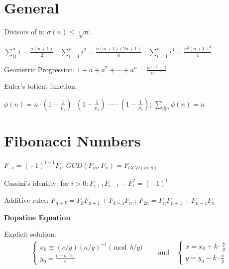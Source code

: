 \documentclass{article}
\begin{document}
\section{General} 
Divisors of n: $\sigma (n) \le \sqrt[3]{n}$. 

$\sum_{i1}^{n}{i}=\frac{n(n+1)}{2}$ ;
$\sum_{i=1}^{n}{i^2} = \frac{n(n+1)(2n+1)}{6}$ ;
$\sum_{i=1}^{n}{i^3} = \frac{n^2(n+1)^2}{4}$

Geometric Progression: $1 + a + a^2 + \cdots + a^n = \frac{a^{n + 1} - 1}{a - 1}$

Euler's totient function: 

$\phi(n) = n \cdot (1 - \frac{1}{p_1}) \cdot (1 - \frac{1}{p_2}) \cdot \cdots \cdot (1 - \frac{1}{p_k})$;
$\sum_{d|n}{\phi(n) = n}$

\section{Fibonacci Numbers}

$F_{-i}=(-1)^{i-1}F_i$;
$GCD(F_m,F_n) = F_{GCD(m,n)}$

Cassini's identity: for $i > 0: F_{i+1}F_{i-1}-F_i^2=(-1)^i$

Additive rules:
$F_{n+k}=F_{k}F_{n+1} + F_{k-1}F_{n}$ ;
$F_{2n}=F_{n}F_{n+1}+F_{n-1}F_{n}$

\bf{Dopatine Equation}

Explicit solution: 
\begin{align}
\begin{cases}
	x_0 \equiv (c/g)(a/g)^{-1} \pmod {b/g} \\
	y_0 = \frac{c-a \cdot x_0}{b}
\end{cases}
& \quad \text{and} \quad
\begin{cases}
	x = x_0 + k \cdot \frac{b}{g} \\
	y = y_0 - k \cdot \frac{a}{g}
\end{cases}
\end{align}
\end{document}
